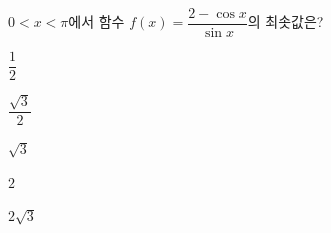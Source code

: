 $0<x<\pi$에서 함수 $f(x)=\dfrac{2-\cos x}{\sin x}$의 최솟값은?
\begin{choices32}{\rule[-3ex]{0pt}{8ex}$\dfrac{1}{2}$}{\rule[-3ex]{0pt}{8ex}$\dfrac{\sqrt{3}}{2}$}{\rule[-3ex]{0pt}{8ex}$\sqrt{3}$}{\rule[-3ex]{0pt}{8ex}$2$}{\rule[-3ex]{0pt}{8ex}$2\sqrt{3}$}\end{choices32}
